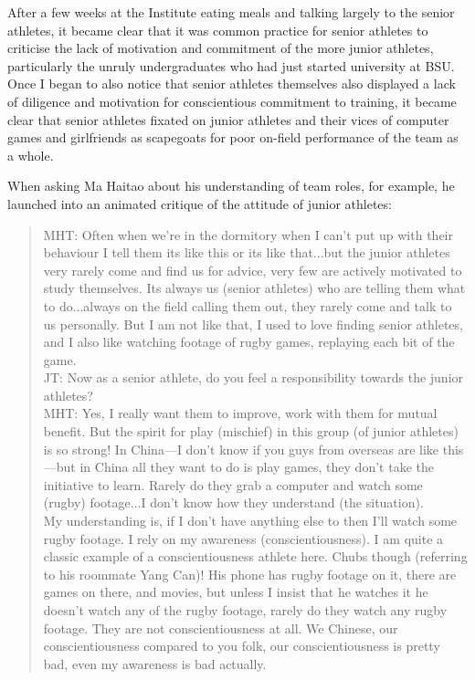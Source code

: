 \begin{CJK}{UTF8}{gbsn}
After a few weeks at the Institute eating meals and talking largely to the senior athletes, it became clear that it was common practice for senior athletes to criticise the lack of motivation and commitment of the more junior athletes, particularly the unruly undergraduates who had just started university at BSU.  Once I began to also notice that senior athletes themselves also displayed a lack of diligence and motivation for conscientious commitment to training, it became clear that senior athletes fixated on junior athletes and their vices of computer games and girlfriends as scapegoats for poor on-field performance of the team as a whole.

When asking Ma Haitao about his understanding of team roles, for example, he launched into an animated critique of the attitude of junior athletes:


  \begin{quote}
    MHT: Often when we're in the dormitory when I can't put up with their behaviour I tell them its like this or its like that...but the junior athletes very rarely come and find us for advice, very few are actively motivated to study themselves. Its always us (senior athletes) who are telling them what to do...always on the field calling them out, they rarely come and talk to us personally.  But I am not like that, I used to love finding senior athletes, and I also like watching footage of rugby games, replaying each bit of the game.\\
    JT: Now as a senior athlete, do you feel a responsibility towards the junior athletes?\\
    MHT: Yes, I really want them to improve, work with them for mutual benefit.  But the spirit for play (mischief) in this group (of junior athletes) is so strong! In China---I don't know if you guys from overseas are like this---but in China all they want to do is play games, they don't take the initiative to learn.  Rarely do they grab a computer and watch some (rugby) footage...I don’t know how they understand (the situation).
\\
    My understanding is, if I don’t have anything else to then I’ll watch some rugby footage. I rely on my awareness (conscientiousness).  I am quite a classic example of a conscientiousness athlete here.  Chubs though (referring to his roommate Yang Can)!  His phone has rugby footage on it, there are games on there, and movies, but unless I insist that he watches it he doesn't watch any of the rugby footage, rarely do they watch any rugby footage.  They are not conscientiousness at all. We Chinese, our conscientiousness compared to you folk, our conscientiousness is pretty bad, even my awareness is bad actually.
  \end{quote}


\end{CJK}
